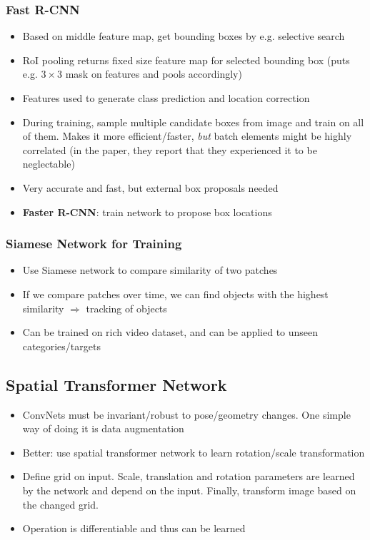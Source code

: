 \subsubsection{Fast R-CNN}
\begin{itemize}
	\item Based on middle feature map, get bounding boxes by e.g. selective search 
	\item RoI pooling returns fixed size feature map for selected bounding box (puts e.g. $3\times 3$ mask on features and pools accordingly)
	\item Features used to generate class prediction and location correction
	\item During training, sample multiple candidate boxes from image and train on all of them. Makes it more efficient/faster, \textit{but} batch elements might be highly correlated (in the paper, they report that they experienced it to be neglectable)
	\item Very accurate and fast, but external box proposals needed
	\item \textbf{Faster R-CNN}: train network to propose box locations
\end{itemize}
\subsubsection{Siamese Network for Training}
\begin{itemize}
	\item Use Siamese network to compare similarity of two patches
	\item If we compare patches over time, we can find objects with the highest similarity $\Rightarrow$ tracking of objects
	\item Can be trained on rich video dataset, and can be applied to unseen categories/targets
\end{itemize}
\subsection{Spatial Transformer Network}
\begin{itemize}
	\item ConvNets must be invariant/robust to pose/geometry changes. One simple way of doing it is data augmentation
	\item Better: use spatial transformer network to learn rotation/scale transformation
	\item Define grid on input. Scale, translation and rotation parameters are learned by the network and depend on the input. Finally, transform image based on the changed grid. 
	\item Operation is differentiable and thus can be learned
\end{itemize}